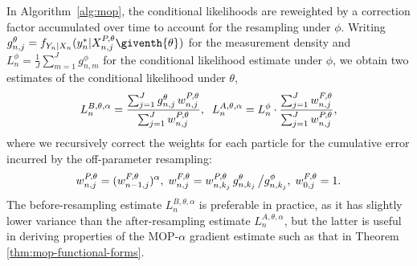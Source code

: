 \documentclass[numsec,webpdf,modern,medium,namedate]{oup-authoring-template}
\newcommand\arxiv[2]{#2} %
\theoremstyle{thmstyleone}%
\theoremstyle{thmstyletwo}%
\theoremstyle{thmstylethree}%
\begin{document}
In Algorithm~\ref{alg:mop}, the conditional likelihoods are reweighted by a correction factor accumulated over time to account for the resampling under $\phi$. 
Writing $g^{\theta}_{n,j}={f}_{{Y}_{n}|{X}_{n}}(y_{n}^{*}|{X}_{n,j}^{P,\theta}\giventh{\theta})$ for the measurement density and $L_n^{\phi} = \frac{1}{J}\sum_{m=1}^{J}g^{\phi}_{n,m}$ for the conditional likelihood estimate under $\phi$, we obtain two estimates of the conditional likelihood under $\theta$,
\arxiv{}{\vspace*{-1.5mm}}
\begin{equation}
     \label{eq:mop-conditional-likelihood}
     L_n^{B,\theta,\alpha} = \frac{\sum_{j=1}^Jg^\theta_{n,j}\, w^{P,\theta}_{n,j}}{\sum_{j=1}^J  w^{P,\theta}_{n,j}}, \arxiv{\hspace{15mm}}{\;\;}
     L_n^{A,\theta,\alpha} = L_n^\phi\cdot \frac{\sum_{j=1}^J w^{F,\theta}_{n,j}}{\sum_{j=1}^J  w^{P,\theta}_{n,j}},
     \arxiv{}{\vspace*{-1.5mm}}
\end{equation}
where we recursively correct the weights for each particle for the cumulative error incurred by the off-parameter resampling:
\arxiv{}{\vspace*{-3ex}}
\begin{equation}
    \label{eq:weighting-scheme}
    w_{n,j}^{P,\theta} = (w_{n-1,j}^{F,\theta})^\alpha, 
    \arxiv{\hspace{5mm}}{\;}
    w^{F,\theta}_{n,j} = w^{P,\theta}_{n,k_j} \, g^{\theta}_{n,k_j} \, \big/ g^{\phi}_{n,k_j}, 
    \arxiv{\hspace{5mm}}{\;}
    w^{F,\theta}_{0,j}= 1.
    \arxiv{}{\vspace*{-3ex}}
\end{equation}
The before-resampling estimate $L_n^{B,\theta,\alpha}$ is preferable in practice, as it has slightly lower variance than the after-resampling estimate $L_n^{A,\theta,\alpha}$, but the latter is useful in deriving properties of the MOP-$\alpha$ gradient estimate such as that in Theorem \ref{thm:mop-functional-forms}.

\end{document}
